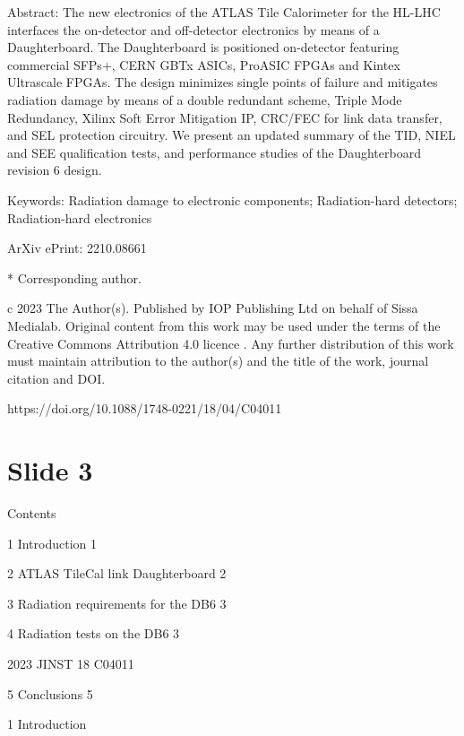 \documentclass{article}
\begin{document}
Abstract:   The   new   electronics   of   the   ATLAS   Tile   Calorimeter   for   the   HL-LHC   interfaces   the 
on-detector   and   off-detector   electronics   by   means   of   a   Daughterboard.   The   Daughterboard   is 
positioned on-detector featuring commercial SFPs+, CERN GBTx ASICs, ProASIC FPGAs and 
Kintex Ultrascale FPGAs.   The design minimizes single points of failure and mitigates radiation 
damage   by   means   of   a   double   redundant   scheme,   Triple   Mode   Redundancy,   Xilinx   Soft   Error 
Mitigation IP, CRC/FEC for link data transfer, and SEL protection circuitry.   We present an updated 
summary of the TID, NIEL and SEE qualification tests, and performance studies of the Daughterboard 
revision 6 design.

Keywords:   Radiation damage to electronic components; Radiation-hard detectors; Radiation-hard 
electronics

ArXiv ePrint:   2210.08661

* Corresponding author.

c  2023 The Author(s).   Published by IOP Publishing Ltd on behalf of 
Sissa Medialab.   Original content from this work may be used under the 
terms of the  Creative Commons Attribution 4.0 licence .   Any further distribution of this 
work must maintain attribution to the author(s) and the title of the work, journal citation 
and DOI.

https://doi.org/10.1088/1748-0221/18/04/C04011

\section*{Slide 3}

Contents

1 
Introduction 
1

2 
ATLAS TileCal link Daughterboard 
2

3 
Radiation requirements for the DB6 
3

4 
Radiation tests on the DB6 
3

2023 JINST 18 C04011

5 
Conclusions 
5

1 
Introduction
\end{document}

